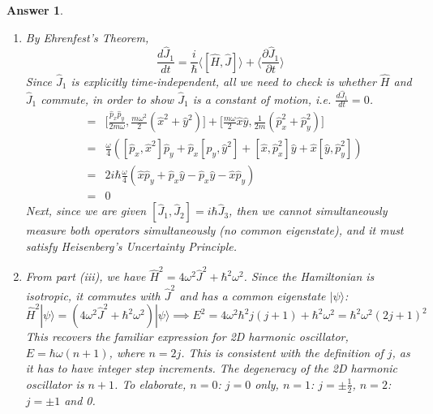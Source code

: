 \documentclass[a4paper]{article}
\newtheorem{ans}{Answer}[subsection]
\theoremstyle{new}
\begin{document}
\begin{ans}
\begin{enumerate}[label=(\roman*)]
The first two terms agree with what we already have. Take the last two terms and take out $\omega^2$:
$$\frac{1}{4}(\hat{x}^2\hat{p}_x^2+\hat{p}_x^2\hat{x}^2+\hat{y}^2\hat{p}_y^2+\hat{p}_y^2\hat{y}^2+2\hat{x}^2\hat{p}_y^2+2\hat{p}_y^2\hat{x}^2)$$
This is equal to Equation (*), except for the missing $(-\hat{x}\hat{p}_y\hat{y}\hat{p}_x-\hat{y}\hat{p}_x\hat{x}\hat{p}_y)+(\hat{p}_x\hat{p}_y\hat{x}\hat{y}+\hat{x}\hat{y}\hat{p}_x\hat{p}_y)$. Now let's regroup this term and rearrange some commuting operators:
$$(\hat{p}_x\hat{p}_y\hat{x}\hat{y}-\hat{y}\hat{p}_x\hat{x}\hat{p}_y)+(\hat{x}\hat{y}\hat{p}_x\hat{p}_y-\hat{x}\hat{p}_y\hat{y}\hat{p}_x)=\hat{p}_x\hat{x}[\hat{p}_y,\hat{y}]+\hat{x}\hat{p}_x[\hat{y},\hat{p}_y]=[\hat{x},\hat{p}_x][\hat{y},\hat{p}_y]=-\hbar^2$$
Hence,
$$4\omega^2\sum_{i=3}^3\hat{J}_i^2=\hat{H}^2-\hbar^2\omega^2$$
Thus, $\alpha=4\omega^2$, $\beta=\hbar^2\omega^2$.
\item By Ehrenfest's Theorem,
$$\frac{d\hat{J}_1}{dt}=\frac{i}{\hbar}\langle[\hat{H},\hat{J}]\rangle+\bigg\langle\frac{\partial\hat{J}_1}{\partial t}\bigg\rangle$$
Since $\hat{J}_1$ is explicitly time-independent, all we need to check is whether $\hat{H}$ and $\hat{J}_1$ commute, in order to show $\hat{J}_1$ is a constant of motion, i.e. $\frac{d\hat{J}_1}{dt}=0$.
\begin{eqnarray}
[\hat{J}_1,\hat{H}]&=&\bigg[\frac{\hat{p}_x\hat{p}_y}{2m\omega},\frac{m\omega^2}{2}(\hat{x}^2+\hat{y}^2)\bigg]+\bigg[\frac{m\omega}{2}\hat{x}\hat{y},\frac{1}{2m}(\hat{p}_x^2+\hat{p}_y^2)\bigg]\nonumber\\&=&\frac{\omega}{4}([\hat{p}_x,\hat{x}^2]\hat{p}_y+\hat{p}_x[\hat{p}_y,\hat{y}^2]+[\hat{x},\hat{p}_x^2]\hat{y}+\hat{x}[\hat{y},\hat{p}_y^2])\nonumber\\&=&2i\hbar\frac{\omega}{4}(\hat{x}\hat{p}_y+\hat{p}_x\hat{y}-\hat{p}_x\hat{y}-\hat{x}\hat{p}_y)\nonumber\\&=&0\nonumber
\end{eqnarray}
Next, since we are given $[\hat{J}_1,\hat{J}_2]=i\hbar\hat{J}_3$, then we cannot simultaneously measure both operators simultaneously (no common eigenstate), and it must satisfy Heisenberg's Uncertainty Principle.
\item From part (iii), we have $\hat{H}^2=4\omega^2\hat{J}^2+\hbar^2\omega^2$. Since the Hamiltonian is isotropic, it commutes with $\hat{J}^2$ and has a common eigenstate $|\psi\rangle$:
$$\hat{H}^2|\psi\rangle=(4\omega^2\hat{J}^2+\hbar^2\omega^2)|\psi\rangle\implies E^2=4\omega^2\hbar^2j(j+1)+\hbar^2\omega^2=\hbar^2\omega^2(2j+1)^2$$
This recovers the familiar expression for 2D harmonic oscillator, $E=\hbar\omega(n+1)$, where $n=2j$. This is consistent with the definition of $j$, as it has to have integer step increments. The degeneracy of the 2D harmonic oscillator is $n+1$. To elaborate, $n=0$: $j=0$ only, $n=1$: $j=\pm\frac{1}{2}$, $n=2$: $j=\pm1$ and 0.
\end{enumerate}
\end{ans}
\end{document}
